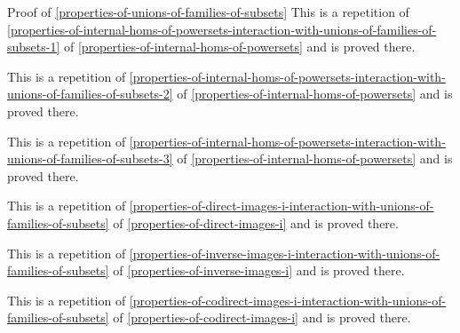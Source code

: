 \begin{Proof}{Proof of \cref{properties-of-unions-of-families-of-subsets}}
    This is a repetition of \cref{properties-of-internal-homs-of-powersets-interaction-with-unions-of-families-of-subsets-1} of \cref{properties-of-internal-homs-of-powersets} and is proved there.

    This is a repetition of \cref{properties-of-internal-homs-of-powersets-interaction-with-unions-of-families-of-subsets-2} of \cref{properties-of-internal-homs-of-powersets} and is proved there.

    This is a repetition of \cref{properties-of-internal-homs-of-powersets-interaction-with-unions-of-families-of-subsets-3} of \cref{properties-of-internal-homs-of-powersets} and is proved there.

    This is a repetition of \cref{properties-of-direct-images-i-interaction-with-unions-of-families-of-subsets} of \cref{properties-of-direct-images-i} and is proved there.

    This is a repetition of \cref{properties-of-inverse-images-i-interaction-with-unions-of-families-of-subsets} of \cref{properties-of-inverse-images-i} and is proved there.

    This is a repetition of \cref{properties-of-codirect-images-i-interaction-with-unions-of-families-of-subsets} of \cref{properties-of-codirect-images-i} and is proved there.


\end{Proof}

